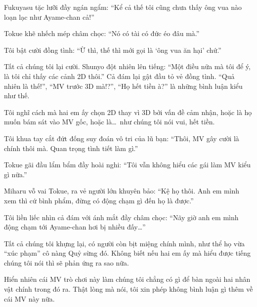\documentclass[../main.tex]{subfiles}
\begin{document}
Fukuyasu tặc lưỡi đầy ngán ngẩm: ``Kể cả thế tôi cũng chưa thấy ông vua nào loạn lạc như Ayame-chan cả!''

Tokue khẽ nhếch mép châm chọc: ``Nó có tài có đức éo đâu mà.''

Tôi bật cười đồng tình: ``Ừ thì, thế thì mới gọi là `ông vua ăn hại' chứ.''

Tất cả chúng tôi lại cười. Shunyo đột nhiên lên tiếng: ``Một điều nữa mà tôi để ý, là tôi chỉ thấy các cảnh 2D thôi.'' Cả đám lại gật đầu tỏ vẻ đồng tình. ``Quả nhiên là thế!'', ``MV trước 3D mà!?'', ``Họ hết tiền à?'' là những bình luận kiểu như thế.

Tôi nghĩ cách mà hai em ấy chọn 2D thay vì 3D bởi vấn đề cảm nhận, hoặc là họ muốn bám sát vào MV gốc, hoặc là\dots\ như chúng tôi nói vui, hết tiền.

Tôi khua tay cắt đứt đống suy đoán vô tri của lũ bạn: ``Thôi, MV gây cười là chính thôi mà. Quan trọng tình tiết làm gì.''

Tokue gãi đầu lẩm bẩm đầy hoài nghi: ``Tôi vẫn không hiểu các gái làm MV kiểu gì nữa.''

Miharu vỗ vai Tokue, ra vẻ người lớn khuyên bảo: ``Kệ họ thôi. Anh em mình xem thì cứ bình phẩm, đừng có động chạm gì đến họ là được.''

Tôi liền liếc nhìn cả đám với ánh mắt đầy châm chọc: ``Nãy giờ anh em mình động chạm tới Ayame-chan hơi bị nhiều đấy\dots''

Tất cả chúng tôi khựng lại, có người còn bịt miệng chính mình, như thể họ vừa ``xúc phạm'' cô nàng Quỷ sừng đó. Không biết nếu hai em ấy mà hiểu được tiếng chúng tôi nói thì sẽ phản ứng ra sao nữa.

Hiển nhiên cái MV trò chơi này làm chúng tôi chẳng có gì để bàn ngoài hai nhân vật chính trong đó ra. Thật lòng mà nói, tôi xin phép không bình luận gì thêm về cái MV này nữa.
\end{document}
